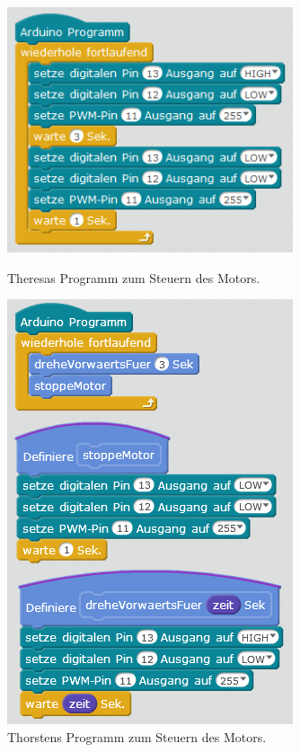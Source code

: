 \begin{figure}[H]
	\begin{minipage}{0.48\textwidth}
		\centering
		\includegraphics[width=0.75\textwidth]{./pics/motorsteuerung-ohne-funktionen.png}
		\caption{Theresas Programm zum Steuern des Motors.}
	\end{minipage}
	\hfill
	\begin{minipage}{0.48\textwidth}
		\centering
		\includegraphics[width=0.75\textwidth]{./pics/motorsteuerung-mit-funktionen.png}
		\caption{Thorstens Programm zum Steuern des Motors.}
	\end{minipage}
\end{figure}

